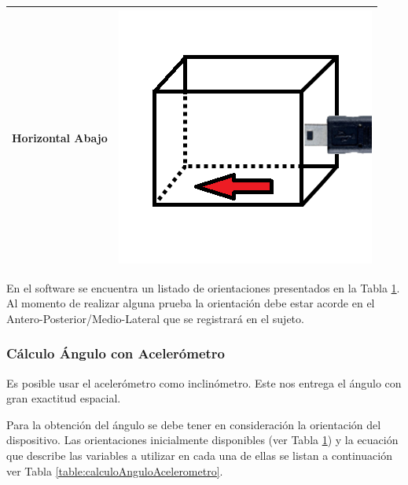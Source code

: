 \documentclass[12pt,a4paper]{article}
\begin{document}
\begin{table}[H]
\begin{tabular}{|c|c|}
		\hline 
		Horizontal Abajo &  \includegraphics[scale=0.2]{images/IMU/horizontalabajo}   \\ 
		\hline 
	\end{tabular}
	\label{table:listadoOrientaciones}
\end{table}

En el software se encuentra un listado de orientaciones presentados en la Tabla \ref{table:listadoOrientaciones}.
Al momento de realizar alguna prueba la orientación debe estar acorde en el Antero-Posterior/Medio-Lateral que se registrará en el sujeto.

\newpage
\subsubsection{Cálculo Ángulo con Acelerómetro} Es posible usar el acelerómetro como inclinómetro. Este nos entrega el ángulo con gran exactitud espacial.

Para la obtención del ángulo se debe tener en consideración la orientación del dispositivo. Las orientaciones inicialmente disponibles (ver Tabla \ref{table:listadoOrientaciones}) y la ecuación que describe las variables a utilizar en cada una de ellas se listan a continuación ver Tabla \ref{table:calculoAnguloAcelerometro}.
\end{document}
